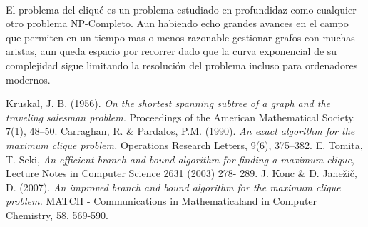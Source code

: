 \documentclass{article}
\begin{document}
\paragraph{} El problema del cliqué es un problema estudiado en profundidaz como cualquier otro problema NP-Completo. Aun habiendo echo grandes avances en el campo que permiten en un tiempo mas o menos razonable gestionar grafos con muchas aristas, aun queda espacio por recorrer dado que la curva exponencial de su complejidad sigue limitando la resolución del problema incluso para ordenadores modernos.
\begin{thebibliography}{9}
 Kruskal, J. B. (1956). \textit{On the shortest spanning subtree of a graph and the traveling salesman problem.} Proceedings of the American Mathematical Society. 7(1), 48–50.
 Carraghan, R. \& Pardalos, P.M. (1990). \textit{An exact algorithm for the maximum clique problem.} Operations Research Letters, 9(6), 375–382.
 E. Tomita, T. Seki, \textit{An efficient branch-and-bound algorithm for finding
a maximum clique}, Lecture Notes in Computer Science 2631 (2003) 278-
289.
 J. Konc \& D. Janežič, D. (2007). \textit{An improved branch and bound algorithm for the maximum clique problem.} MATCH - Communications in Mathematicaland in Computer Chemistry, 58, 569-590.
\end{thebibliography}
\appendix
\end{document}
